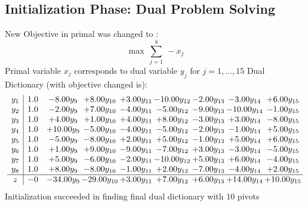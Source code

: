 \documentclass[9pt]{article}
\begin{document}
\subsection{Initialization Phase: Dual Problem Solving}
New Objective in primal was changed to : \[ \max\ \sum_{j=1}^{8}\ - x_j \] 
Primal variable $x_j$ corresponds to dual variable $y_j$ for $j = 1,\ldots,15$
Dual Dictionary (with objective changed is): 
\[\begin{array}{c| c c@{\hskip 2pt} c@{\hskip 2pt} c@{\hskip 2pt} c@{\hskip 2pt} c@{\hskip 2pt} c@{\hskip 2pt} c@{\hskip 2pt} }
 y_{1}   &  1.0 & -8.00 y_{9} & +  8.00 y_{10} & +  3.00 y_{11} & -10.00 y_{12} & -2.00 y_{13} & -3.00 y_{14} & +  6.00 y_{15}\\
 y_{2}   &  1.0 & -2.00 y_{9} & +  7.00 y_{10} & -4.00 y_{11} & -5.00 y_{12} & -9.00 y_{13} & -10.00 y_{14} & -1.00 y_{15}\\
 y_{3}   &  1.0 & +  4.00 y_{9} & +  1.00 y_{10} & +  4.00 y_{11} & +  8.00 y_{12} & -3.00 y_{13} & +  3.00 y_{14} & -8.00 y_{15}\\
 y_{4}   &  1.0 & + 10.00 y_{9} & -5.00 y_{10} & -4.00 y_{11} & -5.00 y_{12} & -2.00 y_{13} & -1.00 y_{14} & +  5.00 y_{15}\\
 y_{5}   &  1.0 & -5.00 y_{9} & -8.00 y_{10} & +  2.00 y_{11} & +  5.00 y_{12} & -1.00 y_{13} & +  5.00 y_{14} & +  6.00 y_{15}\\
 y_{6}   &  1.0 & +  1.00 y_{9} & +  9.00 y_{10} & -9.00 y_{11} & -7.00 y_{12} & +  3.00 y_{13} & -3.00 y_{14} & -5.00 y_{15}\\
 y_{7}   &  1.0 & +  5.00 y_{9} & -6.00 y_{10} & -2.00 y_{11} & -10.00 y_{12} & +  5.00 y_{13} & +  6.00 y_{14} & -4.00 y_{15}\\
 y_{8}   &  1.0 & +  8.00 y_{9} & -8.00 y_{10} & -1.00 y_{11} & +  2.00 y_{12} & -7.00 y_{13} & -4.00 y_{14} & +  2.00 y_{15}\\
\hline
z    &  -0 & -34.00 y_{9} & -29.00 y_{10} & +  3.00 y_{11} & +  7.00 y_{12} & +  6.00 y_{13} & + 14.00 y_{14} & + 10.00 y_{15}\\
\end{array}\]
Initialization succeeded in finding final dual dictionary with 10 pivots
\end{document}
